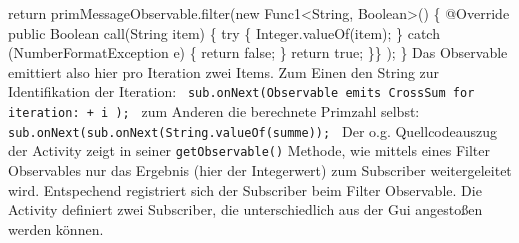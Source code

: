 \documentclass[12pt,oneside,a4paper,bibtotoc,liststotoc]{scrreprt}
\begin{document}
{       return primMessageObservable.filter(new Func1<String, Boolean>() \{\newline
                   @Override\newline
                   public Boolean call(String item) \{\newline
                       try \{\newline
                           Integer.valueOf(item);\newline
                       \} catch (NumberFormatException e) \{\newline
                           return false;\newline
                       \}\newline
                       return true;\newline
               \}\}\newline
               );\newline
   \}\newline
}\newline
Das Observable emittiert also hier pro Iteration zwei Items. Zum Einen den String zur Identifikation der Iteration:\newline
\texttt{\newline
sub.onNext(\grqq Observable emits CrossSum for iteration: \grqq + i );\newline
}\newline
zum Anderen die berechnete Primzahl selbst:\newline
\texttt{\newline
sub.onNext(sub.onNext(String.valueOf(summe));\newline
}\newline
Der o.g. Quellcodeauszug der Activity zeigt in seiner \texttt{getObservable()} Methode, wie mittels eines Filter Observables nur das Ergebnis (hier der Integerwert) zum Subscriber weitergeleitet wird. Entspechend registriert sich der Subscriber beim Filter Observable. Die Activity definiert zwei Subscriber, die unterschiedlich aus der Gui angestoßen werden können.\newline
\end{document}
